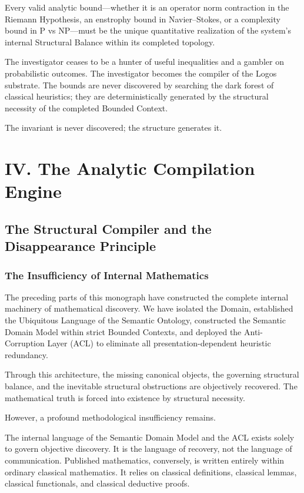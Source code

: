 \documentclass[12pt,openany]{extbook}
\theoremstyle{plain}
\theoremstyle{definition}
\begin{document}
Every valid analytic bound---whether it is an operator norm contraction in the Riemann Hypothesis, an enstrophy bound in Navier--Stokes, or a complexity bound in P vs NP---must be the unique quantitative realization of the system's internal Structural Balance within its completed topology.

The investigator ceases to be a hunter of useful inequalities and a gambler on probabilistic outcomes. The investigator becomes the compiler of the Logos substrate. The bounds are never discovered by searching the dark forest of classical heuristics; they are deterministically generated by the structural necessity of the completed Bounded Context.

The invariant is never discovered; the structure generates it.

\part{IV. The Analytic Compilation Engine}

\chapter{The Structural Compiler and the Disappearance Principle}

\section{The Insufficiency of Internal Mathematics}

The preceding parts of this monograph have constructed the complete internal machinery of mathematical discovery. We have isolated the Domain, established the Ubiquitous Language of the Semantic Ontology, constructed the Semantic Domain Model within strict Bounded Contexts, and deployed the Anti-Corruption Layer (ACL) to eliminate all presentation-dependent heuristic redundancy. 

Through this architecture, the missing canonical objects, the governing structural balance, and the inevitable structural obstructions are objectively recovered. The mathematical truth is forced into existence by structural necessity.

However, a profound methodological insufficiency remains. 

The internal language of the Semantic Domain Model and the ACL exists solely to govern objective discovery. It is the language of recovery, not the language of communication. Published mathematics, conversely, is written entirely within ordinary classical mathematics. It relies on classical definitions, classical lemmas, classical functionals, and classical deductive proofs. 
\end{document}
